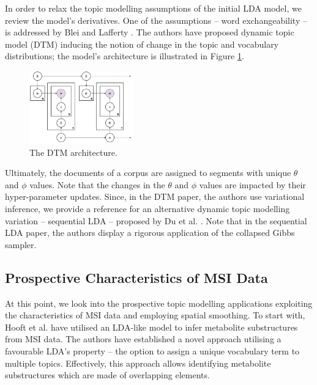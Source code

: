 \documentclass{mpaper}
\begin{document}
\par In order to relax the topic modelling assumptions of the initial LDA model, we review the model's derivatives. One of the assumptions -- word exchangeability -- is addressed by Blei and Lafferty \cite{blei2006dynamic}. 
The authors have proposed dynamic topic model (DTM) inducing the notion of change in the topic and vocabulary distributions; the model's architecture is illustrated in Figure \ref{fig:arch_dtm}.
\begin{figure}[h]
  \centering
  \includegraphics[width=0.4\textwidth]{dtm-architecture.png}
  \caption{The DTM architecture.}
  \label{fig:arch_dtm}
\end{figure}
Ultimately, the documents of a corpus are assigned to segments with unique $\theta$ and $\phi$ values. Note that the changes in the $\theta$ and $\phi$ values are impacted by their hyper-parameter updates. Since, in the DTM paper, the authors use variational inference, we provide a reference for an alternative dynamic topic modelling variation -- sequential LDA -- proposed by Du et al. \cite{du2012sequential}. Note that in the sequential LDA paper, the authors display a rigorous application of the collapsed Gibbs sampler. 

\subsection{Prospective Characteristics of MSI Data}
\par At this point, we look into the prospective topic modelling applications exploiting the characteristics of MSI data and employing spatial smoothing. To start with, Hooft et al. \cite{van2016topic} have utilised an LDA-like model to infer metabolite substructures from MSI data. The authors have established a novel approach utilising a favourable LDA's property -- the option to assign a unique vocabulary term to multiple topics. Effectively, this approach allows identifying metabolite substructures which are made of overlapping elements. 
\end{document}
